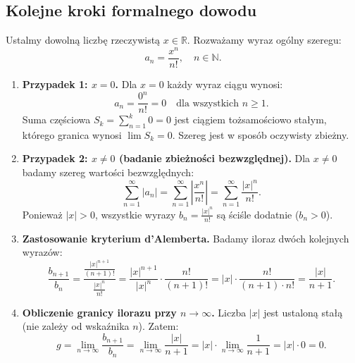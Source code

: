 \vspace{0.2cm}

\subsection*{Kolejne kroki formalnego dowodu}

Ustalmy dowolną liczbę rzeczywistą $x \in \mathbb{R}$. Rozważamy wyraz ogólny szeregu:
\begin{equation*}
    a_n = \frac{x^n}{n!}, \quad n \in \mathbb{N}.
\end{equation*}

\begin{enumerate}[label=\textbf{Krok \arabic*.},leftmargin=*]
    \item \textbf{Przypadek 1: $x = 0$.}
    Dla $x = 0$ każdy wyraz ciągu wynosi:
    \begin{equation*}
        a_n = \frac{0^n}{n!} = 0 \quad \text{dla wszystkich } n \geqslant 1.
    \end{equation*}
    Suma częściowa $S_k = \sum_{n=1}^k 0 = 0$ jest ciągiem tożsamościowo stałym, którego granica wynosi $\lim S_k = 0$. Szereg jest w sposób oczywisty zbieżny.

    \item \textbf{Przypadek 2: $x \neq 0$ (badanie zbieżności bezwzględnej).}
    Dla $x \neq 0$ badamy szereg wartości bezwzględnych:
    \begin{equation*}
        \sum_{n=1}^{\infty} |a_n| = \sum_{n=1}^{\infty} \left| \frac{x^n}{n!} \right| = \sum_{n=1}^{\infty} \frac{|x|^n}{n!}.
    \end{equation*}
    Ponieważ $|x| > 0$, wszystkie wyrazy $b_n = \frac{|x|^n}{n!}$ są ściśle dodatnie ($b_n > 0$).

    \item \textbf{Zastosowanie kryterium d'Alemberta.}
    Badamy iloraz dwóch kolejnych wyrazów:
    \begin{equation*}
        \frac{b_{n+1}}{b_n} = \frac{\frac{|x|^{n+1}}{(n+1)!}}{\frac{|x|^n}{n!}} = \frac{|x|^{n+1}}{|x|^n} \cdot \frac{n!}{(n+1)!} = |x| \cdot \frac{n!}{(n+1) \cdot n!} = \frac{|x|}{n+1}.
    \end{equation*}

    \item \textbf{Obliczenie granicy ilorazu przy $n \to \infty$.}
    Liczba $|x|$ jest ustaloną stałą (nie zależy od wskaźnika $n$). Zatem:
    \begin{equation*}
        g = \lim_{n \to \infty} \frac{b_{n+1}}{b_n} = \lim_{n \to \infty} \frac{|x|}{n+1} = |x| \cdot \lim_{n \to \infty} \frac{1}{n+1} = |x| \cdot 0 = 0.
    \end{equation*}


\end{enumerate}

